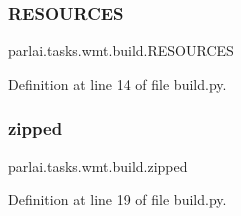 \subsubsection{\texorpdfstring{R\+E\+S\+O\+U\+R\+C\+ES}{RESOURCES}}
{\footnotesize\ttfamily parlai.\+tasks.\+wmt.\+build.\+R\+E\+S\+O\+U\+R\+C\+ES}



Definition at line 14 of file build.\+py.

\mbox{\label{namespaceparlai_1_1tasks_1_1wmt_1_1build_a820e6c5cc1f4656a9ef2ffbcc68b85cc}} 
\subsubsection{\texorpdfstring{zipped}{zipped}}
{\footnotesize\ttfamily parlai.\+tasks.\+wmt.\+build.\+zipped}



Definition at line 19 of file build.\+py.

